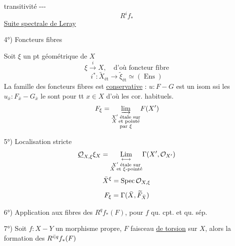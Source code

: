 transitivité -{}-{}-
\[R^i f_*\]
\uline{Suite spectrale de Leray}

4°) Foncteurs fibres

Soit $\xi$ un pt géométrique de $X$
\[
\xi\xrightarrow{i}X,\quad \text{d'où foncteur fibre}
\]
\[
i^*:\widetilde X_{\mathrm{ét}}\longrightarrow\widetilde\xi_{\mathrm{ét}}\simeq(\operatorname{Ens})
\]
La famille des foncteurs fibres est \uline{conservative} : $u:F-G$ est un isom ssi les $u_{\bar x}:F_{\bar x}-G_{\bar x}$ le sont pour tt $x\in X$ d'où les cor. habituels.
\[
F_\xi=\underset{\substack{X'\text{ étale sur}\\X\text{ et pointé}\\\text{par }\xi}}{\relax{\varinjlim}}F(X')
\]

5°) Localisation stricte
\[
\underline{\mathcal O}_{X,\xi}\relax{\relax{\xi_X}}
=\underset{\substack{X'\text{ étale sur}\\X\text{ et }\xi\text{-pointé}}}{\underset{\longleftrightarrow}{\operatorname{Lim}}}
\Gamma(X',\mathcal O_{X'})
\]
\[
\bar X^{\relax{\xi}}=\operatorname{Spec}\mathcal O_{X,\xi}
\]
\[
F_\xi=\Gamma(\bar X,\relax{\widetilde F}_{\bar X})
\]

6°) Application aux fibres des $R^qf_*(F)$, pour $f$ qu. cpt. et qu. sép.


7°)  Soit $f:X-Y$ un morphisme propre, $F$ faisceau \uline{de torsion} sur $X$, alors la formation des $R^{\relax{i|q}}f_*(F)$
